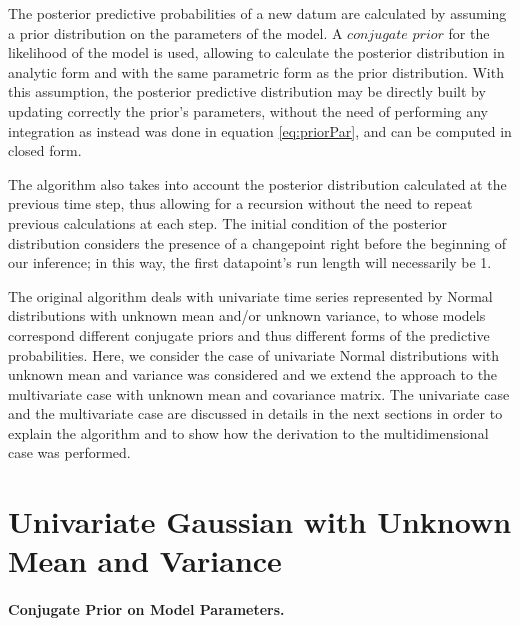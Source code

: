 \documentclass[11pt,twoside,a4paper]{report}
\begin{document}
The posterior predictive probabilities of a new datum are calculated by assuming a prior distribution on the parameters of the model. A $conjugate$ $prior$ for the likelihood of the model is used, allowing to calculate the posterior distribution in analytic form and with the same parametric form as the prior distribution. With this assumption, the posterior predictive distribution may be directly built by updating correctly the prior's parameters, without the need of performing any integration as instead was done in equation \ref{eq:priorPar}, and can be computed in closed form.

The algorithm also takes into account the posterior distribution calculated at the previous time step, thus allowing for a recursion without the need to repeat previous calculations at each step. The initial condition of the posterior distribution considers the presence of a changepoint right before the beginning of our inference; in this way, the first datapoint's run length will necessarily be 1.

The original algorithm deals with univariate time series represented by Normal distributions with unknown mean and/or unknown variance, to whose models correspond different conjugate priors and thus different forms of the predictive probabilities. Here, we consider the case of univariate Normal distributions with unknown mean and variance was considered and we extend the approach to the multivariate case with unknown mean and covariance matrix. The univariate case and the multivariate case are discussed in details in the next sections in order to explain the algorithm and to show how the derivation to the multidimensional case was performed.

\section{Univariate Gaussian with Unknown Mean and Variance}

\paragraph{Conjugate Prior on Model Parameters.}
\end{document}
